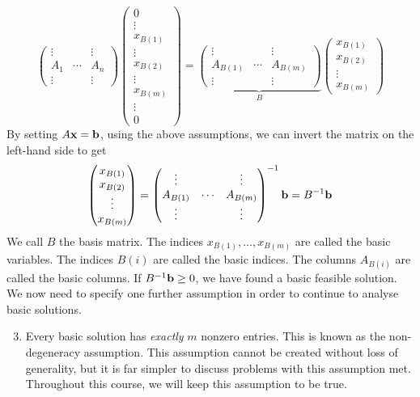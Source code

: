 \[
	\begin{pmatrix}
		\vdots &        & \vdots \\
		A_1    & \cdots & A_n    \\
		\vdots &        & \vdots
	\end{pmatrix} \begin{pmatrix}
		0 \\ \vdots \\ x_{B(1)} \\ \vdots \\ x_{B(2)} \\ \vdots \\ x_{B(m)} \\ \vdots \\ 0
	\end{pmatrix} = \underbrace{\begin{pmatrix}
			\vdots   &        & \vdots   \\
			A_{B(1)} & \cdots & A_{B(m)} \\
			\vdots   &        & \vdots
		\end{pmatrix}}_{B} \begin{pmatrix}
		x_{B(1)} \\
		x_{B(2)} \\
		\vdots   \\
		x_{B(m)}
	\end{pmatrix}
\]
By setting \( A \vb x = \vb b \), using the above assumptions, we can invert the matrix on the left-hand side to get
\[
	\begin{pmatrix}
		x_{B(1)} \\
		x_{B(2)} \\
		\vdots   \\
		x_{B(m)}
	\end{pmatrix} = \begin{pmatrix}
		\vdots   &        & \vdots   \\
		A_{B(1)} & \cdots & A_{B(m)} \\
		\vdots   &        & \vdots
	\end{pmatrix}^{-1} \vb b = B^{-1} \vb b
\]
We call \( B \) the basis matrix.
The indices \( x_{B(1)}, \dots, x_{B(m)} \) are called the basic variables.
The indices \( B(i) \) are called the basic indices.
The columns \( A_{B(i)} \) are called the basic columns.
If \( B^{-1} \vb b \geq 0 \), we have found a basic feasible solution.
We now need to specify one further assumption in order to continue to analyse basic solutions.
\begin{enumerate}[A:]
	\setcounter{enumi}{2}
	\item Every basic solution has \textit{exactly} \( m \) nonzero entries.
	      This is known as the non-degeneracy assumption.
	      This assumption cannot be created without loss of generality, but it is far simpler to discuss problems with this assumption met.
	      Throughout this course, we will keep this assumption to be true.
\end{enumerate}

